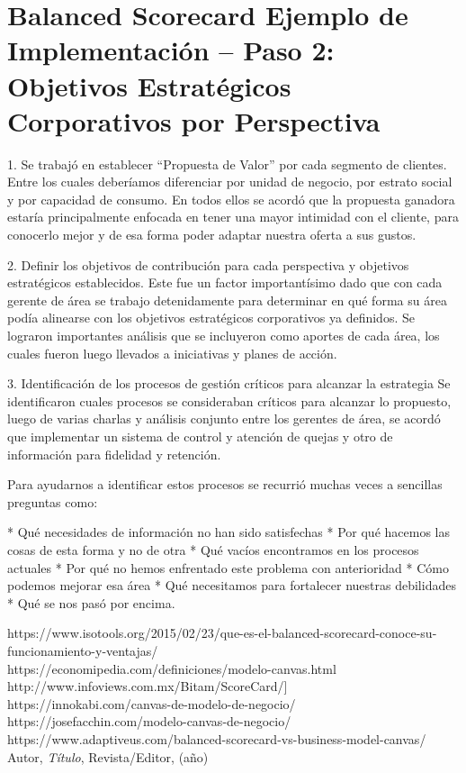 \section{Balanced Scorecard Ejemplo de Implementación – Paso 2: Objetivos Estratégicos Corporativos por Perspectiva}
\item {1. Se trabajó en establecer “Propuesta de Valor” por cada segmento de clientes. Entre los cuales deberíamos diferenciar por unidad de negocio, por estrato social y por capacidad de consumo. En todos ellos se acordó que la propuesta ganadora estaría principalmente enfocada en tener una mayor intimidad con el cliente, para conocerlo mejor y de esa forma poder adaptar nuestra oferta a sus gustos.

2. Definir los objetivos de contribución para cada perspectiva y objetivos estratégicos establecidos.  Este fue un factor importantísimo dado que con cada gerente de área se trabajo detenidamente para determinar en qué forma su área podía alinearse con los objetivos estratégicos corporativos ya definidos. Se lograron importantes análisis que se incluyeron como aportes de cada área, los cuales fueron luego llevados a iniciativas y planes de acción.

3. Identificación de los procesos de gestión críticos para alcanzar la estrategia
Se identificaron cuales procesos se consideraban críticos para alcanzar lo propuesto, luego de varias charlas y análisis conjunto entre los gerentes de área, se acordó que implementar un sistema de control y atención de quejas y otro de información para fidelidad y retención.

Para ayudarnos a identificar estos procesos se recurrió muchas veces a sencillas preguntas como:

* Qué necesidades de información no han sido satisfechas
* Por qué hacemos las cosas de esta forma y no de otra
* Qué vacíos encontramos en los procesos actuales
* Por qué no hemos enfrentado este problema con anterioridad
* Cómo podemos mejorar esa área
* Qué necesitamos para fortalecer nuestras debilidades
* Qué se nos pasó por encima.}


\begin{thebibliography}{99}
https://www.isotools.org/2015/02/23/que-es-el-balanced-scorecard-conoce-su-funcionamiento-y-ventajas/\\
https://economipedia.com/definiciones/modelo-canvas.html\\
http://www.infoviews.com.mx/Bitam/ScoreCard/]\\
https://innokabi.com/canvas-de-modelo-de-negocio/\\
https://josefacchin.com/modelo-canvas-de-negocio/\\
https://www.adaptiveus.com/balanced-scorecard-vs-business-model-canvas/\\

 Autor, \emph{Título}, Revista/Editor, (año)

\end{thebibliography}


